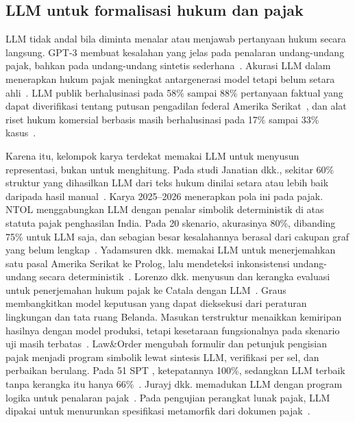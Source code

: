 \subsection{LLM untuk formalisasi hukum dan pajak}
\label{subsec:llm-formal}

LLM tidak andal bila diminta menalar atau menjawab pertanyaan hukum secara langsung. GPT-3 membuat kesalahan yang jelas pada penalaran undang-undang pajak, bahkan pada undang-undang sintetis sederhana~\cite{blairstanek2023gpt3}. Akurasi LLM dalam menerapkan hukum pajak meningkat antargenerasi model tetapi belum setara ahli~\cite{nay2024taxattorneys}. LLM publik berhalusinasi pada 58\% sampai 88\% pertanyaan faktual yang dapat diverifikasi tentang putusan pengadilan federal Amerika Serikat~\cite{dahl2024legalfictions}, dan alat riset hukum komersial berbasis  masih berhalusinasi pada 17\% sampai 33\% kasus~\cite{magesh2025hallucination}.

Karena itu, kelompok karya terdekat memakai LLM untuk menyusun representasi, bukan untuk menghitung. Pada studi Janatian dkk., sekitar 60\% struktur yang dihasilkan LLM dari teks hukum dinilai setara atau lebih baik daripada hasil manual~\cite{janatian2023texttostructure}. Karya 2025--2026 menerapkan pola ini pada pajak. NTOL menggabungkan LLM dengan penalar simbolik deterministik di atas  statuta pajak penghasilan India. Pada 20 skenario, akurasinya 80\%, dibanding 75\% untuk LLM saja, dan sebagian besar kesalahannya berasal dari cakupan graf yang belum lengkap~\cite{veeramani2026neurosymbolic}. Yadamsuren dkk. memakai LLM untuk menerjemahkan satu pasal  Amerika Serikat ke Prolog, lalu mendeteksi inkonsistensi undang-undang secara deterministik~\cite{yadamsuren2026formalization}. Lorenzo dkk. menyusun  dan kerangka evaluasi untuk penerjemahan hukum pajak ke Catala dengan LLM~\cite{lorenzo2025translating}. Graus membangkitkan model keputusan yang dapat dieksekusi dari peraturan lingkungan dan tata ruang Belanda. Masukan terstruktur menaikkan kemiripan hasilnya dengan model produksi, tetapi kesetaraan fungsionalnya pada skenario uji masih terbatas~\cite{graus2026executable}. Law\&Order mengubah formulir dan petunjuk pengisian pajak menjadi program simbolik lewat sintesis LLM, verifikasi per sel, dan perbaikan berulang. Pada 51 SPT , ketepatannya 100\%, sedangkan LLM terbaik tanpa kerangka itu hanya 66\%~\cite{han2026autoformalization}. Jurayj dkk. memadukan LLM dengan program logika untuk penalaran pajak~\cite{jurayj2026tax}. Pada pengujian perangkat lunak pajak, LLM dipakai untuk menurunkan spesifikasi metamorfik dari dokumen pajak~\cite{srinivas2023fewshot,khiabani2026agentic}.

